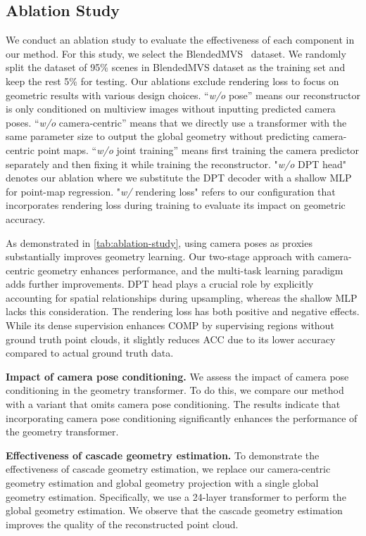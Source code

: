 
\subsection{Ablation Study}
We conduct an ablation study to evaluate the effectiveness of each component in our method. For this study, we select the BlendedMVS~\cite{yao2020blendedmvs} dataset.
We randomly split the dataset of 95\% scenes in BlendedMVS dataset as the training set and keep the rest 5\% for testing.
Our ablations exclude rendering loss to focus on geometric results with various design choices.
``\textit{w/o} pose'' means our reconstructor is only conditioned on multiview images without inputting predicted camera poses. ``\textit{w/o} camera-centric'' means that we directly use a transformer with the same parameter size to output the global geometry without predicting camera-centric point maps. ``\textit{w/o} joint training'' means first training the camera predictor separately and then fixing it while training the reconstructor. 
"\textit{w/o} DPT head" denotes our ablation where we substitute the DPT decoder with a shallow MLP for point-map regression. "\textit{w/} rendering loss" refers to our configuration that incorporates  rendering loss during training to evaluate its impact on geometric accuracy. 

As demonstrated in \cref{tab:ablation-study}, using camera poses as proxies substantially improves geometry learning. Our two-stage approach with camera-centric geometry enhances performance, and the multi-task learning paradigm adds further improvements. DPT head plays a crucial role by explicitly accounting for spatial relationships during upsampling, whereas the shallow MLP lacks this consideration. The rendering loss has both positive and negative effects. While its dense supervision enhances COMP by supervising regions without ground truth point clouds, it slightly reduces ACC due to its lower accuracy compared to actual ground truth data.

\iffalse
\noindent\textbf{Impact of camera pose conditioning.}
We assess the impact of camera pose conditioning in the geometry transformer. To do this, we compare our method with a variant that omits camera pose conditioning. The results indicate that incorporating camera pose conditioning significantly enhances the performance of the geometry transformer.

\noindent\textbf{Effectiveness of cascade geometry estimation.}
To demonstrate the effectiveness of cascade geometry estimation, we replace our camera-centric geometry estimation and global geometry projection with a single global geometry estimation. Specifically, we use a 24-layer transformer to perform the global geometry estimation. We observe that the cascade geometry estimation improves the quality of the reconstructed point cloud.


